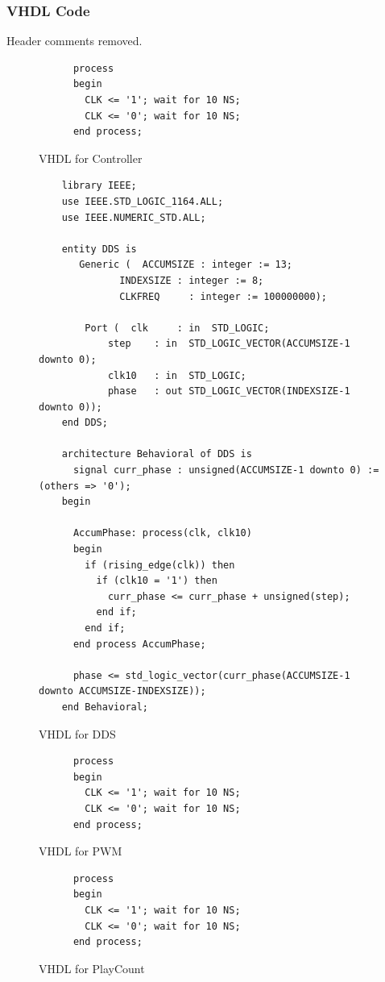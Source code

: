 \documentclass{article}
\begin{document}
	    \subsubsection{VHDL Code}
	      Header comments removed.

	      \begin{figure}[H]
	        \caption{VHDL for Controller}
	        \begin{verbatim}
	  process
	  begin
	    CLK <= '1'; wait for 10 NS;
	    CLK <= '0'; wait for 10 NS;
	  end process;
	        \end{verbatim}
	      \end{figure}

	      \begin{figure}[H]
	        \caption{VHDL for DDS}
	        \begin{verbatim}
	library IEEE;
	use IEEE.STD_LOGIC_1164.ALL;
	use IEEE.NUMERIC_STD.ALL;

	entity DDS is
	   Generic (  ACCUMSIZE : integer := 13;
	          INDEXSIZE : integer := 8;
	          CLKFREQ     : integer := 100000000);
	          
	    Port (  clk     : in  STD_LOGIC;
	        step    : in  STD_LOGIC_VECTOR(ACCUMSIZE-1 downto 0);
	        clk10   : in  STD_LOGIC;
	        phase   : out STD_LOGIC_VECTOR(INDEXSIZE-1 downto 0));
	end DDS;

	architecture Behavioral of DDS is
	  signal curr_phase : unsigned(ACCUMSIZE-1 downto 0) := (others => '0');
	begin

	  AccumPhase: process(clk, clk10)
	  begin
	    if (rising_edge(clk)) then      
	      if (clk10 = '1') then     
	        curr_phase <= curr_phase + unsigned(step);
	      end if;
	    end if;
	  end process AccumPhase;
	  
	  phase <= std_logic_vector(curr_phase(ACCUMSIZE-1 downto ACCUMSIZE-INDEXSIZE));
	end Behavioral;
	        \end{verbatim}
	      \end{figure}

	      \begin{figure}[H]
	        \caption{VHDL for PWM}
	        \begin{verbatim}
	  process
	  begin
	    CLK <= '1'; wait for 10 NS;
	    CLK <= '0'; wait for 10 NS;
	  end process;
	        \end{verbatim}
	      \end{figure}

	      \begin{figure}[H]
	        \caption{VHDL for PlayCount}
	        \begin{verbatim}
	  process
	  begin
	    CLK <= '1'; wait for 10 NS;
	    CLK <= '0'; wait for 10 NS;
	  end process;
	        \end{verbatim}
	      \end{figure}
\end{document}
